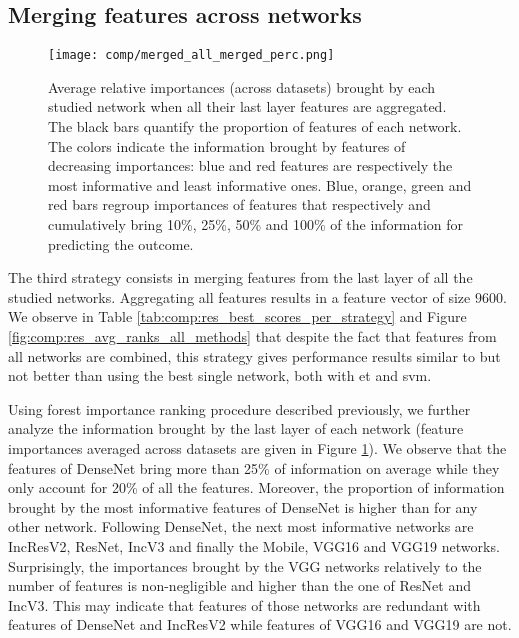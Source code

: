 \subsection{Merging features across networks}
\label{ssec:comp:exp_merge_net}


\begin{figure}
    \centering
    \texttt{[image: comp/merged\_all\_merged\_perc.png]}
    \caption{Average relative importances (across datasets) brought by each studied network when all their last layer features are aggregated. The black bars quantify the proportion of features of each network. The colors indicate the information brought by features of decreasing importances: blue and red features are respectively the most informative and least informative ones. Blue, orange, green and red bars regroup importances of features that respectively and cumulatively bring 10\%, 25\%, 50\% and 100\% of the information for predicting the outcome.}
    \label{fig:comp:models_merged_avg_imp}
\end{figure} 


The third strategy consists in merging features from the last layer of all the studied networks. Aggregating all features results in a feature vector of size $9600$. We observe in Table \ref{tab:comp:res_best_scores_per_strategy} and Figure \ref{fig:comp:res_avg_ranks_all_methods} that despite the fact that features from all networks are combined, this strategy gives performance results similar to but not better than using the best single network, both with \acrshort{et} and \acrshort{svm}.

Using forest importance ranking procedure described previously, we further analyze the information brought by the last layer of each network (feature importances averaged across datasets are given in Figure \ref{fig:comp:models_merged_avg_imp}). We observe that the features of DenseNet bring more than 25\% of information on average while they only account for 20\% of all the features. Moreover, the proportion of information brought by the most informative features of DenseNet is higher than for any other network. Following DenseNet, the next most informative networks are IncResV2, ResNet, IncV3 and finally the Mobile, VGG16 and VGG19 networks. 
Surprisingly, the importances brought by the VGG networks relatively to the number of features is non-negligible and higher than the one of ResNet and IncV3. This may indicate that features of those networks are redundant with features of DenseNet and IncResV2 while features of VGG16 and VGG19 are not.


